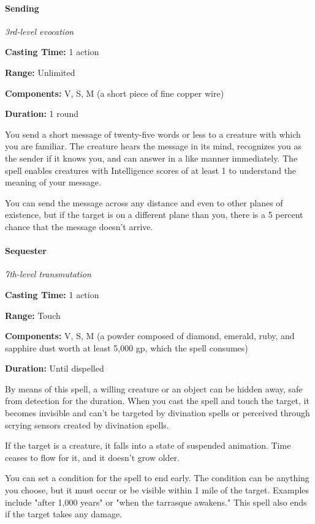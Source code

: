 \documentclass[
]{article}
\begin{document}
\hypertarget{sending}{%
\paragraph{Sending}\label{sending}}

\emph{3rd-level evocation}

\textbf{Casting Time:} 1 action

\textbf{Range:} Unlimited

\textbf{Components:} V, S, M (a short piece of fine copper wire)

\textbf{Duration:} 1 round

You send a short message of twenty-five words or less to a creature with
which you are familiar. The creature hears the message in its mind,
recognizes you as the sender if it knows you, and can answer in a like
manner immediately. The spell enables creatures with Intelligence scores
of at least 1 to understand the meaning of your message.

You can send the message across any distance and even to other planes of
existence, but if the target is on a different plane than you, there is
a 5 percent chance that the message doesn't arrive.

\hypertarget{sequester}{%
\paragraph{Sequester}\label{sequester}}

\emph{7th-level transmutation}

\textbf{Casting Time:} 1 action

\textbf{Range:} Touch

\textbf{Components:} V, S, M (a powder composed of diamond, emerald,
ruby, and sapphire dust worth at least 5,000 gp, which the spell
consumes)

\textbf{Duration:} Until dispelled

By means of this spell, a willing creature or an object can be hidden
away, safe from detection for the duration. When you cast the spell and
touch the target, it becomes invisible and can't be targeted by
divination spells or perceived through scrying sensors created by
divination spells.

If the target is a creature, it falls into a state of suspended
animation. Time ceases to flow for it, and it doesn't grow older.

You can set a condition for the spell to end early. The condition can be
anything you choose, but it must occur or be visible within 1 mile of
the target. Examples include "after 1,000 years" or "when the tarrasque
awakens." This spell also ends if the target takes any damage.
\end{document}
